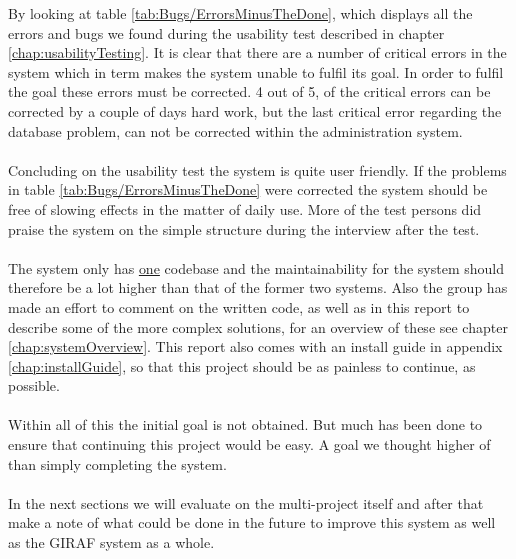 By looking at table \ref{tab:Bugs/ErrorsMinusTheDone}, which displays all the errors and bugs we found during the usability test described in chapter \vref{chap:usabilityTesting}. It is clear that there are a number of critical errors in the system which in term makes the system unable to fulfil its goal. In order to fulfil the goal these errors must be corrected.
4 out of 5, of the critical errors can be corrected by a couple of days hard work, but the last critical error regarding the database problem, can not be corrected within the administration system.\\
\\
Concluding on the usability test the system is quite user friendly. If the problems in table \ref{tab:Bugs/ErrorsMinusTheDone} were corrected the system should be free of slowing effects in the matter of daily use. More of the test persons did praise the system on the simple structure during the interview after the test.\\
\\
The system only has \underline{one} codebase and the maintainability for the system should therefore be a lot higher than that of the former two systems. Also the group has made an effort to comment on the written code, as well as in this report to describe some of the more complex solutions, for an overview of these see chapter \vref{chap:systemOverview}. 
This report also comes with an install guide in appendix \ref{chap:installGuide}, so that this project should be as painless to continue, as possible.\\
\\
Within all of this the initial goal is not obtained. But much has been done to ensure that continuing this project would be easy. A goal we thought higher of than simply completing the system.\\
\\
In the next sections we will evaluate on the multi-project itself and after that make a note of what could be done in the future to improve this system as well as the GIRAF system as a whole.
